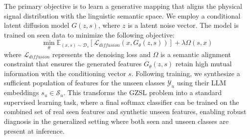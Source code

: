 The primary objective is to learn a generative mapping that aligns the physical signal distribution with the linguistic semantic space. We employ a conditional latent diffusion model $G(z, s)$, where $z$ is a latent noise vector. The model is trained on seen data to minimize the following objective:
\begin{equation}
\min_{\theta} \mathbb{E}_{(x, s) \sim \mathcal{D}_s} [ \mathcal{L}_{diffusion}(x, G_\theta(z, s)) ] + \lambda \Omega(s, x)
\end{equation}
where $\mathcal{L}_{diffusion}$ represents the denoising loss and $\Omega$ is a semantic alignment constraint that ensures the generated features $G_\theta(z, s)$ retain high mutual information with the conditioning vector $s$. Following training, we synthesize a sufficient population of features for the unseen classes $\mathcal{Y}_u$ using their LLM embeddings $s_u \in \mathcal{S}_u$. This transforms the GZSL problem into a standard supervised learning task, where a final softmax classifier can be trained on the combined set of real seen features and synthetic unseen features, enabling robust diagnosis in the generalized setting where both seen and unseen classes are present at inference.